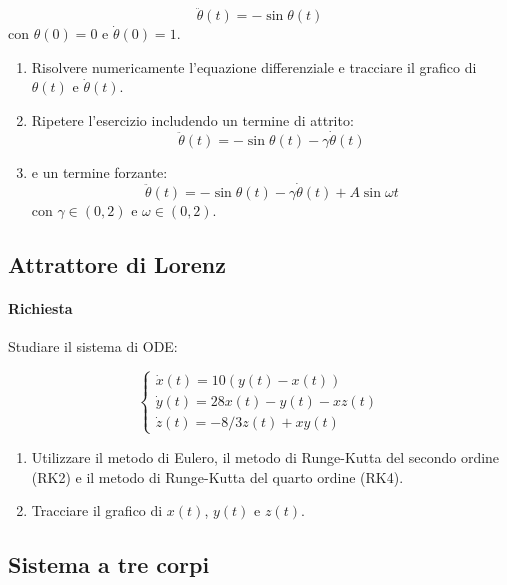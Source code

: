 \begin{equation}
\ddot{\theta}(t) = -\sin{\theta(t)}
\end{equation}
con $\theta(0) = 0$ e $\dot{\theta}(0) = 1$.

\begin{enumerate}
\item Risolvere numericamente l'equazione differenziale e tracciare il grafico di $\theta(t)$ e $\dot{\theta}(t)$.
\item Ripetere l'esercizio includendo un termine di attrito:
   \[
   \ddot{\theta}(t) = -\sin{\theta(t)} - \gamma \dot{\theta}(t)
   \]
\item e un termine forzante: 
   \[
   \ddot{\theta}(t) = -\sin{\theta(t)} - \gamma \dot{\theta}(t) + A \sin{\omega t}
   \]
   con $\gamma \in (0, 2)$ e $\omega \in (0, 2)$.

\end{enumerate}

\subsection{Attrattore di Lorenz}

\paragraph{Richiesta}

Studiare il sistema di ODE:

\begin{equation}
\begin{cases}
\dot{x}(t) = 10(y(t) - x(t)) \\
\dot{y}(t) = 28x(t) - y(t) - xz(t) \\
\dot{z}(t) = -8/3 z(t) + xy(t)
\end{cases}
\end{equation}

\begin{enumerate}
\item Utilizzare il metodo di Eulero, il metodo di Runge-Kutta del secondo ordine (RK2) e il metodo di Runge-Kutta del quarto ordine (RK4).
\item Tracciare il grafico di $x(t)$, $y(t)$ e $z(t)$.
\end{enumerate}

\subsection{Sistema a tre corpi}

